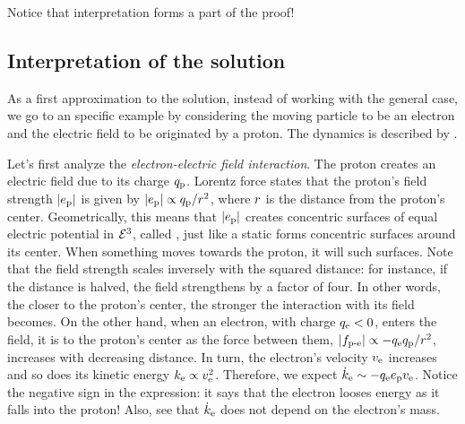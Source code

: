 Notice that interpretation forms a part of the proof!


\subsection{Interpretation of the solution}
%
As a first approximation to the solution, instead of working with the general case, we go to an specific example by considering the moving particle to be an electron and the electric field to be originated by a proton. The dynamics is described by .

Let's first analyze the \emph{electron-electric field interaction}. The proton creates an electric field due to its charge $q_\text{p}$. Lorentz force states that the proton's field strength $\vert{e_\text{p}}\vert$ is given by $\vert{e_\text{p}}\vert\propto q_\text{p}/r^2$, where $r$ is the distance from the proton's center. Geometrically, this means that $\vert{e_\text{p}}\vert$ creates concentric surfaces of equal electric potential in $\mathcal{E}^{3}$, called , just like a static  forms concentric  surfaces around its center. When something moves towards the proton, it will  such surfaces. Note that the field strength scales inversely with the squared distance: for instance, if the distance is halved, the field strengthens by a factor of four. In other words, the closer to the proton's center, the stronger the interaction with its field becomes. On the other hand, when an electron, with charge $q_\text{e} < 0$, enters the field, it is  to the proton's center as the force between them, $\vert{f_\text{p-e}}\vert\propto -q_\text{e}q_\text{p}/r^2$, increases with decreasing distance. In turn, the electron's velocity $v_\text{e}$ increases and so does its kinetic energy $k_\text{e}\propto v_\text{e}^2$. Therefore, we expect $\dot{k}_\text{e}\sim-q_\text{e}e_\text{p}v_\text{e}$. Notice the negative sign in the expression: it says that the electron looses energy as it falls into the proton! Also, see that $\dot{k}_\text{e}$ does not depend on the electron's mass.

